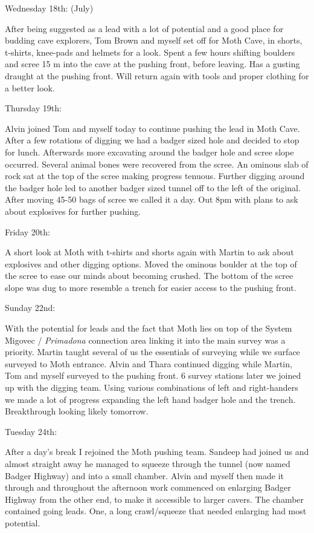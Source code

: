 Wednesday 18th: (July)

After being suggested as a lead with a lot of potential and a good place
for budding cave explorers, Tom Brown and myself set off for Moth Cave,
in shorts, t-shirts, knee-pads and helmets for a look. Spent a few hours
shifting boulders and scree 15 m into the cave at the pushing front,
before leaving. Has a gusting draught at the pushing front. Will return
again with tools and proper clothing for a better look.

Thursday 19th:

Alvin joined Tom and myself today to continue pushing the lead in Moth
Cave. After a few rotations of digging we had a badger sized hole and
decided to stop for lunch. Afterwards more excavating around the badger
hole and scree slope occurred. Several animal bones were recovered from
the scree. An ominous slab of rock sat at the top of the scree making
progress tenuous. Further digging around the badger hole led to another
badger sized tunnel off to the left of the original. After moving 45-50
bags of scree we called it a day. Out 8pm with plans to ask about
explosives for further pushing.

Friday 20th:

A short look at Moth with t-shirts and shorts again with Martin to ask
about explosives and other digging options. Moved the ominous boulder at
the top of the scree to ease our minds about becoming crushed. The
bottom of the scree slope was dug to more resemble a trench for easier
access to the pushing front.

Sunday 22nd:

With the potential for leads and the fact that Moth lies on top of the
System Migovec / \emph{Primadona} connection area linking it into the
main survey was a priority. Martin taught several of us the essentials
of surveying while we surface surveyed to Moth entrance. Alvin and Thara
continued digging while Martin, Tom and myself surveyed to the pushing
front. 6 survey stations later we joined up with the digging team. Using
various combinations of left and right-handers we made a lot of progress
expanding the left hand badger hole and the trench. Breakthrough looking
likely tomorrow.

Tuesday 24th:

After a day's break I rejoined the Moth pushing team. Sandeep had joined
us and almost straight away he managed to squeeze through the tunnel
(now named Badger Highway) and into a small chamber. Alvin and myself
then made it through and throughout the afternoon work commenced on
enlarging Badger Highway from the other end, to make it accessible to
larger cavers. The chamber contained going leads. One, a long
crawl/squeeze that needed enlarging had most potential.

